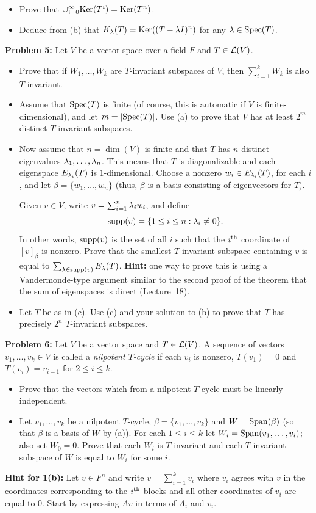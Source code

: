 \documentclass[11pt]{amsart}
\begin{document}
\begin{itemize}
\item[(b)] Prove that $\cup_{i=0}^{\infty}{\rm Ker}(T^{i})={\rm Ker}(T^n)$.
\item[(c)] Deduce from (b) that $K_{{\lambda}}(T)={\rm Ker}((T-{\lambda} I)^n)$ for any ${\lambda}\in {\rm Spec}(T)$.
\end{itemize}
\skv
{\bf Problem 5:} Let $V$ be a vector space over a field $F$ and $T\in{\mathcal L}(V)$.
\begin{itemize}
\item[(a)] Prove that if $W_1,\ldots, W_k$ are $T$-invariant subspaces of $V$, then $\sum_{i=1}^k W_k$ is also $T$-invariant.
\item[(b)] Assume that ${\rm Spec}(T)$ is finite (of course, this is automatic if $V$ is finite-dimensional), and let $m=|{\rm Spec}(T)|$.
Use (a) to prove that $V$ has at least $2^m$ distinct $T$-invariant subspaces.
\item[(c)] Now assume that $n=\dim(V)$ is finite and that $T$ has $n$ distinct eigenvalues ${\lambda}_1,\ldots, {\lambda}_n$.
This means that $T$ is diagonalizable and each eigenspace $E_{{\lambda}_i}(T)$ is $1$-dimensional. Choose a nonzero $w_i\in E_{{\lambda}_i}(T)$,
for each $i$, and let $\beta=\{w_1,\ldots,w_n\}$ (thus, $\beta$ is a basis consisting of eigenvectors for $T$).

Given $v\in V$, write $v=\sum_{i=1}^n {\lambda}_i w_i$, and define $${\rm supp}(v)=\{1\leq i\leq n: {\lambda}_i\neq 0\}.$$ In other words,
${\rm supp}(v)$ is the set of all $i$ such that the $i^{\rm th}$ coordinate of $[v]_{\beta}$ is nonzero.
Prove that the smallest $T$-invariant subspace containing $v$ is equal
to $\sum_{{\lambda}\in {\rm supp}(v)}E_{{\lambda}}(T)$. {\bf Hint:} one way to prove this is using a Vandermonde-type argument similar
to the second proof of the theorem that the sum of eigenspaces is direct (Lecture~18).
\item[(d)] Let $T$ be as in (c). Use (c) and your solution to (b) to prove that $T$ has precisely $2^n$ $T$-invariant subspaces.
\end{itemize}
\skv
{\bf Problem 6:} Let $V$ be a vector space and $T\in{\mathcal L}(V)$. A sequence of vectors $v_1,\ldots, v_k\in V$
is called a \emph{nilpotent $T$-cycle} if each $v_i$ is nonzero, $T(v_1)=0$ and $T(v_i)=v_{i-1}$ for $2\leq i\leq k$.
\begin{itemize}
\item[(a)] Prove that the vectors which from a nilpotent $T$-cycle must be linearly independent.
\item[(b)] Let $v_1,\ldots, v_k$ be a nilpotent $T$-cycle, $\beta=\{v_1,\ldots, v_k\}$ and $W={\rm Span}(\beta)$ (so that
$\beta$ is a basis of $W$ by (a)). For each $1\leq i\leq k$ let $W_i={\rm Span}(v_1,\ldots, v_i)$; also set $W_0=0$.
Prove that each $W_i$ is $T$-invariant and each $T$-invariant subspace of $W$ is equal to $W_i$ for some $i$.  
\end{itemize}

\newpage 
{\bf Hint for 1(b):} Let $v\in F^n$ and write $v=\sum_{i=1}^k v_i$ where $v_i$ agrees with $v$ in the coordinates corresponding to the
$i^{\rm th}$ blocks and all other coordinates of $v_i$ are equal to $0$. Start by expressing $Av$ in terms of $A_i$ and $v_i$.
\end{document}

